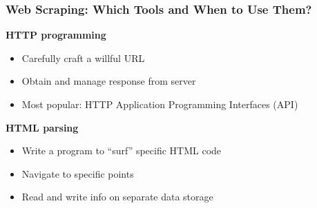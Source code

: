 \documentclass[10pt, aspectratio=1610, natbib, handout]{beamer}
\begin{document}
\begin{frame}


  \end{frame}

  \begin{frame}
    \frametitle{Web Scraping: Which Tools and When to Use Them?}






    \textbf{HTTP programming}  \hfill{}
      \begin{itemize}
        \item Carefully craft a willful URL
        \item Obtain and manage response from server
        \item Most popular: HTTP Application Programming Interfaces (API)
      \end{itemize}

    \vfill\pause

    \textbf{HTML parsing}  \hfill{}
      \begin{itemize}
        \item Write a program to ``surf'' specific HTML code
        \item Navigate to specific points
        \item Read and write info on separate data storage
      \end{itemize}


\end{frame}
\end{document}
